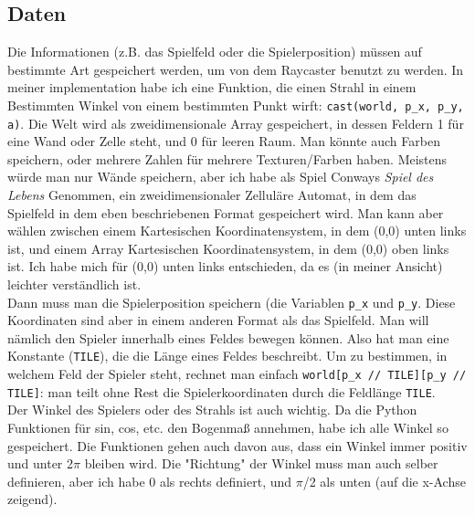 \documentclass[a4paper,12pt]{report}
\begin{document}
\subsection{Daten}
Die Informationen (z.B. das Spielfeld oder die Spielerposition) müssen auf bestimmte Art gespeichert werden, um von dem Raycaster benutzt zu werden. In meiner implementation habe ich eine Funktion, die einen Strahl in einem Bestimmten Winkel von einem bestimmten Punkt wirft: \texttt{cast(world, p\_x, p\_y, a)}. Die Welt wird als zweidimensionale Array gespeichert, in dessen Feldern 1 für eine Wand oder Zelle steht, und 0 für leeren Raum. Man könnte auch Farben speichern, oder mehrere Zahlen für mehrere Texturen/Farben haben. Meistens würde man nur Wände speichern, aber ich habe als Spiel Conways \textit{Spiel des Lebens} Genommen, ein zweidimensionaler Zelluläre Automat, in dem das Spielfeld in dem eben beschriebenen Format gespeichert wird. Man kann aber wählen zwischen einem Kartesischen Koordinatensystem, in dem (0,0) unten links ist, und einem Array Kartesischen Koordinatensystem, in dem (0,0) oben links ist. Ich habe mich für (0,0) unten links entschieden, da es (in meiner Ansicht) leichter verständlich ist. \\
Dann muss man die Spielerposition speichern (die Variablen \texttt{p\_x} und \texttt{p\_y}. Diese Koordinaten sind aber in einem anderen Format als das Spielfeld. Man will nämlich den Spieler innerhalb eines Feldes bewegen können. Also hat man eine Konstante (\texttt{TILE}), die die Länge eines Feldes beschreibt. Um zu bestimmen, in welchem Feld der Spieler steht, rechnet man einfach \texttt{world[p\_x // TILE][p\_y // TILE]}: man teilt ohne Rest die Spielerkoordinaten durch die Feldlänge \texttt{TILE}. \\
Der Winkel des Spielers oder des Strahls ist auch wichtig. Da die Python Funktionen für sin, cos, etc. den Bogenmaß annehmen, habe ich alle Winkel so gespeichert. Die Funktionen gehen auch davon aus, dass ein Winkel immer positiv und unter 2$\pi$ bleiben wird. Die "Richtung" der Winkel muss man auch selber definieren, aber ich habe 0 als rechts definiert, und $\pi$/2 als unten (auf die x-Achse zeigend).
\end{document}
